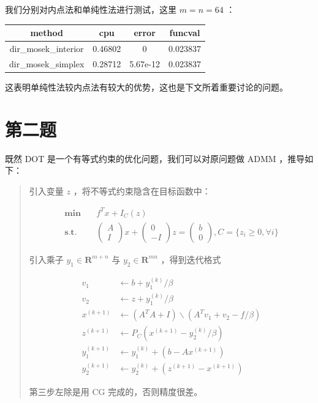 \documentclass[]{article}
\begin{document}
我们分别对内点法和单纯性法进行测试，这里 \(m=n=64\) ：

\begin{longtable}[]{@{}c|ccc@{}}
\hline
method & cpu & error & funcval\tabularnewline
\hline
dir\_mosek\_interior & 0.46802 & 0 & 0.023837\tabularnewline
dir\_mosek\_simplex & 0.28712 & 5.67e-12 & 0.023837\tabularnewline
\hline
\end{longtable}

这表明单纯性法较内点法有较大的优势，这也是下文所着重要讨论的问题。

\part{第二题}

既然 DOT 是一个有等式约束的优化问题，我们可以对原问题做 ADMM
，推导如下：

\begin{quote}
引入变量 \(z\) ，将不等式约束隐含在目标函数中：

\begin{align}
\textbf{min} \quad & f^T x + I_C(z)\\
\textbf{s.t.} \quad & \begin{pmatrix} A \\ I\end{pmatrix} x + \begin{pmatrix} 0 \\ -I\end{pmatrix}z=\begin{pmatrix} b \\ 0\end{pmatrix}, C=\{z_i \ge 0, \forall i\}
\end{align}

引入乘子 \(y_1 \in \mathbf{R}^{m+n}\) 与 \(y_2 \in \mathbf{R}^{mn}\)
，得到迭代格式

\begin{align}
v_1 &\leftarrow b+y^{(k)}_1/\beta \\
v_2 &\leftarrow z+y^{(k)}_1/\beta \\
x^{(k+1)} &\leftarrow (A^TA+I) \backslash (A^Tv_1+v_2-f/\beta) \\
z^{(k+1)} &\leftarrow P_C(x^{(k+1)}-y^{(k)}_2/\beta) \\
y_1^{(k+1)} &\leftarrow y_1^{(k)} + (b-Ax^{(k+1)}) \\
y_2^{(k+1)} &\leftarrow y_2^{(k)} + (z^{(k+1)}-x^{(k+1)})
\end{align}

第三步左除是用 CG 完成的，否则精度很差。
\end{quote}
\end{document}
